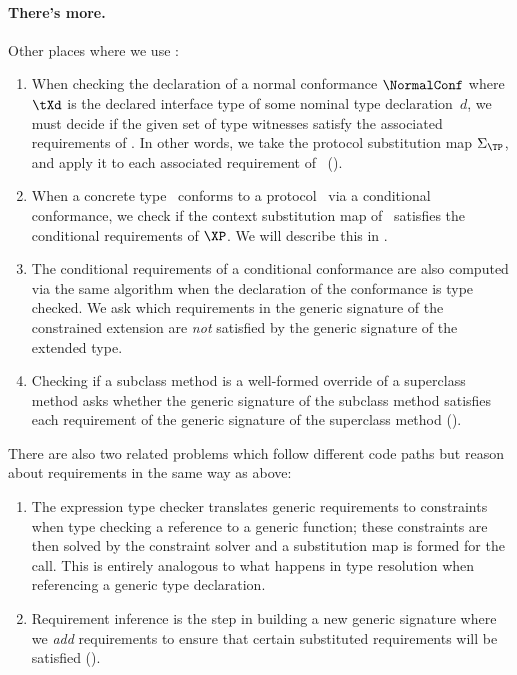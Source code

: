 \documentclass[../generics]{subfiles}
\begin{document}
\paragraph{There's more.} Other places where we use :
\begin{enumerate}
\item When checking the declaration of a normal conformance $\NormalConf$ where $\tXd$ is the declared interface type of some nominal type declaration~$d$, we must decide if the given set of type witnesses satisfy the associated requirements of \tP. In other words, we take the protocol substitution map $\Sigma_{\TP}$, and apply it to each associated requirement of \tP\ ().

\item When a concrete type \tX\ conforms to a protocol \tP\ via a conditional conformance, we check if the context substitution map of \tX\ satisfies the conditional requirements of $\XP$. We will describe this in .

\item The conditional requirements of a conditional conformance are also computed via the same algorithm when the declaration of the conformance is type checked. We ask which requirements in the generic signature of the constrained extension are \emph{not} satisfied by the generic signature of the extended type.

\item Checking if a subclass method is a well-formed override of a superclass method asks whether the generic signature of the subclass method satisfies each requirement of the generic signature of the superclass method ().
\end{enumerate}
There are also two related problems which follow different code paths but reason about requirements in the same way as above:
\begin{enumerate}
\item The expression type checker translates generic requirements to constraints when type checking a reference to a generic function; these constraints are then solved by the constraint solver and a substitution map is formed for the call. This is entirely analogous to what happens in type resolution when referencing a generic type declaration.

\item Requirement inference is the step in building a new generic signature where we \emph{add} requirements to ensure that certain substituted requirements will be satisfied ().
\end{enumerate}
\end{document}
